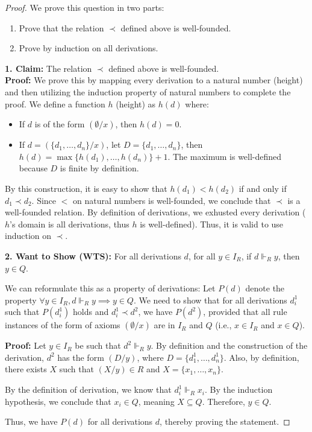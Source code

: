 \begin{proof}
    We prove this question in two parts:
    \begin{enumerate}
        \item Prove that the relation \( \prec \) defined above is well-founded.
        \item Prove by induction on all derivations.
    \end{enumerate}

    \textbf{1. Claim:} The relation \( \prec \) defined above is well-founded.  \\
    \indent \textbf{Proof:} We prove this by mapping every derivation to a natural number (height) and then utilizing the induction property of natural numbers to complete the proof.  
    We define a function \( h \) (height) as \( h(d) \) where:
    \begin{itemize}
        \item If \( d \) is of the form \( (\emptyset / x) \), then \( h(d) = 0 \).
        \item If \( d = (\{d_1, \dots, d_n\} / x) \), let \( D = \{d_1, \dots, d_n\} \), then \( h(d) = \max\{h(d_1), \dots, h(d_n)\} + 1 \). The maximum is well-defined because \( D \) is finite by definition.
    \end{itemize}

    By this construction, it is easy to show that \( h(d_1) < h(d_2) \) if and only if \( d_1 \prec d_2 \). Since \( < \) on natural numbers is well-founded, we conclude that \( \prec \) is a well-founded relation. By definition of derivations, we exhusted every derivation ($h$'s domain is all derivations, thus $h$ is well-defined).
    Thus, it is valid to use induction on \( \prec \).

    \textbf{2. Want to Show (WTS):}  
    For all derivations \( d \), for all \( y \in I_R \), if \( d \Vdash_R y \), then \( y \in Q \).

    We can reformulate this as a property of derivations:  
    Let \( P(d) \) denote the property \( \forall y \in I_R, d \Vdash_R y \implies y \in Q \).  
    We need to show that for all derivations \( d^{ 1}_i \) such that \( P(d^{ 1}_i) \) holds and \( d^{ 1}_i \prec d^{ 2} \), we have \( P(d^{ 2}) \), provided that all rule instances of the form of axioms \( (\emptyset / x) \) are in \( I_R \) and \( Q \) (i.e., \( x \in I_R \) and \( x \in Q \)).

    \textbf{Proof:}  
    Let \( y \in I_R \) be such that \( d^{ 2} \Vdash_R y \). By definition and the construction of the derivation, \( d^{ 2} \) has the form \( (D / y) \), where \( D = \{d^{ 1}_1, \dots, d^{ 1}_n\} \). Also, by definition, there exists \( X \) such that \( (X / y) \in R \) and \( X = \{x_1, \dots, x_n\} \).

    By the definition of derivation, we know that \( d^{ 1}_i \Vdash_R x_i \). By the induction hypothesis, we conclude that \( x_i \in Q \), meaning \( X \subseteq Q \). Therefore, \( y \in Q \).

    Thus, we have \( P(d) \) for all derivations \( d \), thereby proving the statement.

\end{proof}

